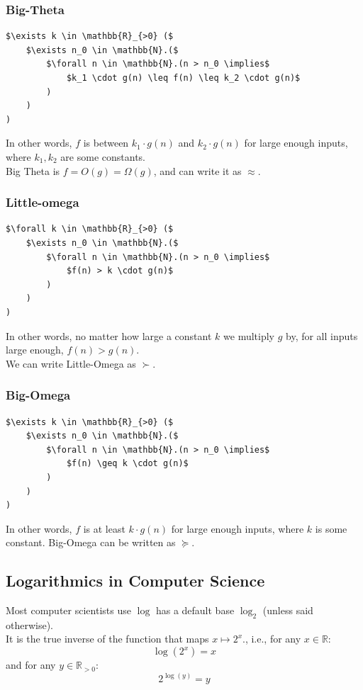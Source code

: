 \documentclass{article}
\begin{document}
\subsubsection{Big-Theta}
\begin{lstlisting}
$\exists k \in \mathbb{R}_{>0} ($
    $\exists n_0 \in \mathbb{N}.($
        $\forall n \in \mathbb{N}.(n > n_0 \implies$
            $k_1 \cdot g(n) \leq f(n) \leq k_2 \cdot g(n)$
        )
    )
)
\end{lstlisting}
In other words, $f$ is between $k_1 \cdot g(n)$ and $k_2 \cdot g(n)$ for large enough inputs, where $k_1, k_2$ are some constants.\\
Big Theta is $f = O(g) = \Omega(g)$, and can write it as $\approx$.

\subsubsection{Little-omega}
\begin{lstlisting}
$\forall k \in \mathbb{R}_{>0} ($
    $\exists n_0 \in \mathbb{N}.($
        $\forall n \in \mathbb{N}.(n > n_0 \implies$
            $f(n) > k \cdot g(n)$
        )
    )
)
\end{lstlisting}
In other words, no matter how large a constant $k$ we multiply $g$ by, for all inputs large enough, $f(n) > g(n)$.\\
We can write Little-Omega as $\succ$.

\subsubsection{Big-Omega}
\begin{lstlisting}
$\exists k \in \mathbb{R}_{>0} ($
    $\exists n_0 \in \mathbb{N}.($
        $\forall n \in \mathbb{N}.(n > n_0 \implies$
            $f(n) \geq k \cdot g(n)$
        )
    )
)
\end{lstlisting}
In other words, $f$ is at least $k \cdot g(n)$ for large enough inputs, where $k$ is some constant.
Big-Omega can be written as $\succeq$.


\subsection{Logarithmics in Computer Science}
Most computer scientists use $\log$ has a default base $\log_2$ (unless said otherwise).\\
It is the true inverse of the function that maps $x \mapsto 2^x$., i.e.,  for any $x \in \mathbb{R}:$
$$\log(2^x) = x$$
and for any $y \in \mathbb{R}_{>0}$:
$$2^{\log(y)} = y$$
\end{document}
